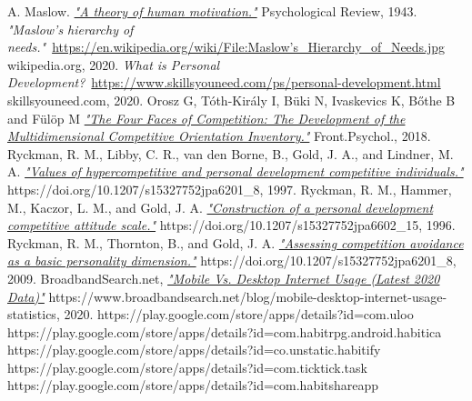 \documentclass[twoside]{ctuthesis}
\begin{document}
    \maketitle
    
    
    
    
    
    
    
    

    
    \begin{thebibliography}{99}
         A. Maslow. \href{http://psychclassics.yorku.ca/Maslow/motivation.htm}{\emph{"A theory of human motivation."}} Psychological Review, 1943.
         \emph{"Maslow's hierarchy of needs."}~\href{https://en.wikipedia.org/wiki/File:Maslow's_Hierarchy_of_Needs.jpg}{https://en.wikipedia.org/wiki/File:Maslow's\_Hierarchy\_of\_Needs.jpg} wikipedia.org, 2020.
         \emph{What is Personal Development?}~\href{https://www.skillsyouneed.com/ps/personal-development.html}{https://www.skillsyouneed.com/ps/personal-development.html} skillsyouneed.com, 2020.
         Orosz G, Tóth-Király I, Büki N, Ivaskevics K, Bőthe B and Fülöp M \href{https://www.frontiersin.org/articles/10.3389/fpsyg.2018.00779/full}{\emph{"The Four Faces of Competition: The Development of the Multidimensional Competitive Orientation Inventory."}} Front.Psychol., 2018.
         Ryckman, R. M., Libby, C. R., van den Borne, B., Gold, J. A., and Lindner, M. A. \href{https://doi.org/10.1207/s15327752jpa6201_8}{\emph{"Values of hypercompetitive and personal development competitive individuals."}} https://doi.org/10.1207/s15327752jpa6201\_8, 1997.
         Ryckman, R. M., Hammer, M., Kaczor, L. M., and Gold, J. A. \href{https://doi.org/10.1207/s15327752jpa6602_15}{\emph{"Construction of a personal development competitive attitude scale."}} https://doi.org/10.1207/s15327752jpa6602\_15, 1996.
         Ryckman, R. M., Thornton, B., and Gold, J. A. \href{https://doi.org/10.1207/s15327752jpa6201_8}{\emph{"Assessing competition avoidance as a basic personality dimension."}} https://doi.org/10.1207/s15327752jpa6201\_8, 2009.
         BroadbandSearch.net, \href{https://www.broadbandsearch.net/blog/mobile-desktop-internet-usage-statistics}{\emph{"Mobile Vs. Desktop Internet Usage (Latest 2020 Data)"}} https://www.broadbandsearch.net/blog/mobile-desktop-internet-usage-statistics, 2020.
         https://play.google.com/store/apps/details?id=com.uloo
         https://play.google.com/store/apps/details?id=com.habitrpg.android.habitica
         https://play.google.com/store/apps/details?id=co.unstatic.habitify
         https://play.google.com/store/apps/details?id=com.ticktick.task
         https://play.google.com/store/apps/details?id=com.habitshareapp
    \end{thebibliography}
\end{document}
